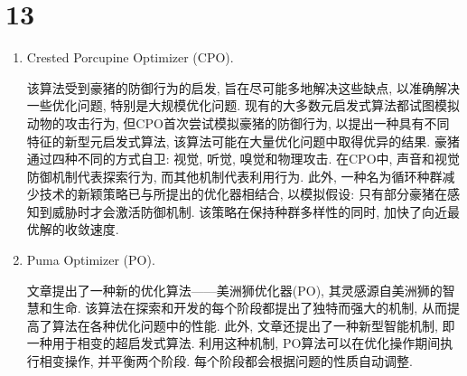 \section*{13}

\begin{enumerate}
    \item Crested Porcupine Optimizer (CPO)\cite{abdel2024crested}.

        该算法受到豪猪的防御行为的启发, 旨在尽可能多地解决这些缺点, 以准确解决一些优化问题, 特别是大规模优化问题.
        现有的大多数元启发式算法都试图模拟动物的攻击行为, 但CPO首次尝试模拟豪猪的防御行为, 以提出一种具有不同特征的新型元启发式算法, 该算法可能在大量优化问题中取得优异的结果.
        豪猪通过四种不同的方式自卫: 视觉, 听觉, 嗅觉和物理攻击.
        在CPO中, 声音和视觉防御机制代表探索行为, 而其他机制代表利用行为.
        此外, 一种名为循环种群减少技术的新颖策略已与所提出的优化器相结合, 以模拟假设: 只有部分豪猪在感知到威胁时才会激活防御机制.
        该策略在保持种群多样性的同时, 加快了向近最优解的收敛速度.

    \item Puma Optimizer (PO)\cite{lian2024parrot}.

        文章提出了一种新的优化算法——美洲狮优化器(PO), 其灵感源自美洲狮的智慧和生命.
        该算法在探索和开发的每个阶段都提出了独特而强大的机制, 从而提高了算法在各种优化问题中的性能.
        此外, 文章还提出了一种新型智能机制, 即一种用于相变的超启发式算法.
        利用这种机制, PO算法可以在优化操作期间执行相变操作, 并平衡两个阶段.
        每个阶段都会根据问题的性质自动调整.
\end{enumerate}

